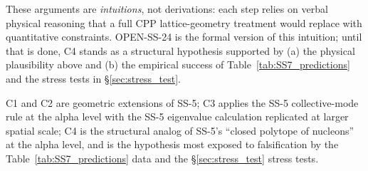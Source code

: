 \documentclass[11pt,letterpaper]{article}
\begin{document}
\begin{enumerate}[label=(C\arabic*)]
These arguments are \emph{intuitions}, not derivations: each step relies on verbal physical reasoning that a full CPP lattice-geometry treatment would replace with quantitative constraints. OPEN-SS-24 is the formal version of this intuition; until that is done, C4 stands as a structural hypothesis supported by (a) the physical plausibility above and (b) the empirical success of Table~\ref{tab:SS7_predictions} and the stress tests in \S\ref{sec:stress_test}.
\end{enumerate}

C1 and C2 are geometric extensions of SS-5; C3 applies the SS-5 collective-mode rule at the alpha level with the SS-5 eigenvalue calculation replicated at larger spatial scale; C4 is the structural analog of SS-5's ``closed polytope of nucleons'' at the alpha level, and is the hypothesis most exposed to falsification by the Table~\ref{tab:SS7_predictions} data and the \S\ref{sec:stress_test} stress tests.
\end{document}

